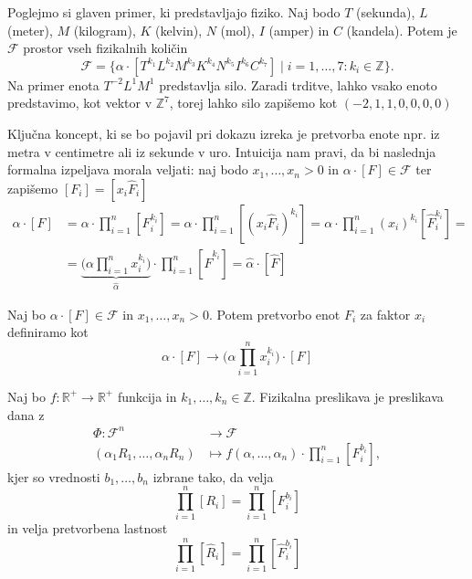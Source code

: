 \documentclass[mat2, tisk]{fmfdelo}
\newcommand{\R}{\mathbb R}
\newcommand{\Z}{\mathbb Z}
\begin{document}
\begin{primer}
 Poglejmo si glaven primer, ki predstavljajo fiziko. Naj bodo 
 $T$ (sekunda), $L$ (meter), $M$ (kilogram), $K$ (kelvin), $N$ (mol), $I$ (amper) in $C$ (kandela).
 Potem je $\mathcal{F}$ prostor vseh fizikalnih količin
 $$
 \mathcal{F} = \{\alpha \cdot [T^{k_1} L^{k_2} M^{k_3} K^{k_4} N^{k_5} I^{k_6} C^{k_7}] \mid i = 1, \dots, 7: k_i \in \Z\}.
 $$
 Na primer enota $T^{-2}L^1M^1$ predstavlja silo. Zaradi trditve, lahko 
 vsako enoto predstavimo, kot vektor v $\Z^7$, torej lahko silo zapišemo kot 
 $(-2, 1, 1, 0, 0, 0, 0)$
 \end{primer}

Ključna koncept, ki se bo pojavil pri dokazu izreka je pretvorba enote npr.
iz metra v centimetre ali iz sekunde v uro. Intuicija nam pravi, da 
bi naslednja formalna izpeljava morala veljati: naj bodo $x_1, \dots, x_n > 0$ in 
$\alpha\cdot[F]\in \mathcal{F}$ ter zapišemo $[F_i] = [x_i \hat{F}_i]$
\begin{align*}
\alpha \cdot [F] &= \alpha\cdot \prod_{i=1}^n [F_i^{k_i}] = 
\alpha\cdot \prod_{i=1}^n [(x_i\hat{F}_i)^{k_i}] = 
\alpha\cdot \prod_{i=1}^n (x_i)^{k_i} [\hat{F}_i^{k_i}] = \\
&= \underbrace{\Big(\alpha\prod_{i=1}^n x_i^{k_i}\Big)}_{\hat{\alpha}} \cdot \prod_{i=1}^n [\hat{F}^{k_i}] = \hat{\alpha}\cdot [\hat{F}]
\end{align*}

\begin{definicija}
Naj bo $\alpha\cdot [F] \in \mathcal{F}$ in $x_1, \dots, x_n > 0$. Potem 
pretvorbo enot $F_i$ za faktor $x_i$ definiramo kot 
\begin{equation}
 \alpha\cdot [F] \rightarrow \Big(\alpha\prod_{i=1}^n x_i^{k_i}\Big)\cdot [F]
\end{equation}
\end{definicija}

\begin{definicija}
Naj bo $f: \R^+ \rightarrow \R^+$ funkcija in $k_1, \dots, k_n \in \Z$.
Fizikalna preslikava je preslikava dana z 
\begin{align*}
\Phi: \mathcal{F}^n &\rightarrow \mathcal{F} \\
(\alpha_1 R_1, \dots, \alpha_n R_n) &\mapsto f(\alpha, \dots, \alpha_n)\cdot \prod_{i=1}^{n} [F_i^{b_i}],
\end{align*}
kjer so vrednosti $b_1, \dots, b_n$ izbrane tako, da velja 
$$
\prod_{i=1}^{n} [R_i] = \prod_{i=1}^{n} [F_i^{b_i}]
$$
in velja pretvorbena lastnost 
\begin{equation}
\label{pretvorba}
\prod_{i=1}^{n} [\hat{R}_i] = \prod_{i=1}^{n} [\hat{F}_i^{b_i}]
\end{equation}
\end{definicija}
\end{document}
